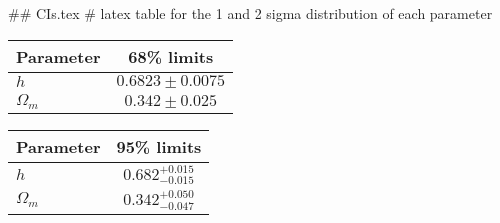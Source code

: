 ## CIs.tex
# latex table for the 1 and 2 sigma distribution of each parameter

\begin{tabular} { l  c}
 Parameter &  68\% limits\\
\hline
{\boldmath$h              $} & $0.6823\pm 0.0075          $\\
{\boldmath$\Omega_m       $} & $0.342\pm 0.025            $\\
\hline
\end{tabular}

\begin{tabular} { l  c}
 Parameter &  95\% limits\\
\hline
{\boldmath$h              $} & $0.682^{+0.015}_{-0.015}   $\\
{\boldmath$\Omega_m       $} & $0.342^{+0.050}_{-0.047}   $\\
\hline
\end{tabular}
